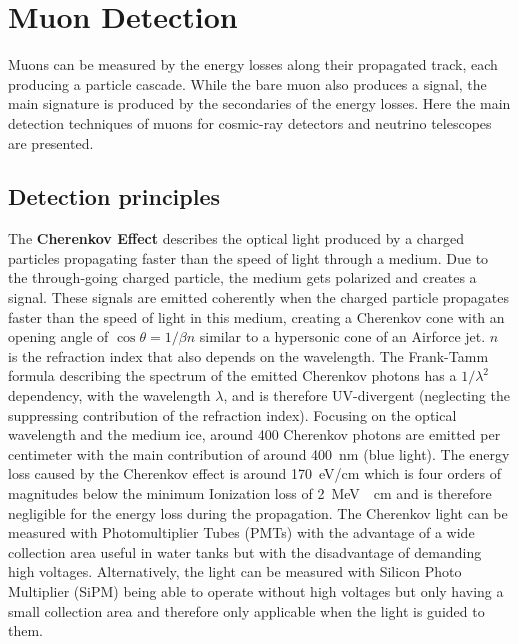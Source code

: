 \chapter{Muon Detection} \label{sec:detection}

Muons can be measured by the energy losses along their propagated track, each producing a particle cascade.
While the bare muon also produces a signal, the main signature is produced by the secondaries of the energy losses.
Here the main detection techniques of muons for cosmic-ray detectors and neutrino telescopes are presented.

\section{Detection principles}

The \textbf{Cherenkov Effect} \cite{Cherenkov34} describes the optical light produced by a charged particles propagating faster than the speed of light through a medium.
Due to the through-going charged particle, the medium gets polarized and creates a signal.
These signals are emitted coherently when the charged particle propagates faster than the speed of light in this medium, creating a Cherenkov cone with an opening angle of $\cos \theta = 1/\beta n$ similar to a hypersonic cone of an Airforce jet.
$n$ is the refraction index that also depends on the wavelength.
The Frank-Tamm formula \cite{FrankTamm37} describing the spectrum of the emitted Cherenkov photons has a $1/\lambda^2$ dependency, with the wavelength $\lambda$, and is therefore UV-divergent (neglecting the suppressing contribution of the refraction index).
Focusing on the optical wavelength and the medium ice, around \num{400} Cherenkov photons are emitted per centimeter with the main contribution of around \SI{400}{nm} (blue light).
The energy loss caused by the Cherenkov effect is around \SI{170}{eV/cm} which is four orders of magnitudes below the minimum Ionization loss of \SI{2}{MeV.\per.cm} and is therefore negligible for the energy loss during the propagation.
The Cherenkov light can be measured with Photomultiplier Tubes (PMTs) with the advantage of a wide collection area useful in water tanks but with the disadvantage of demanding high voltages.
Alternatively, the light can be measured with Silicon Photo Multiplier (SiPM) being able to operate without high voltages but only having a small collection area and therefore only applicable when the light is guided to them.

